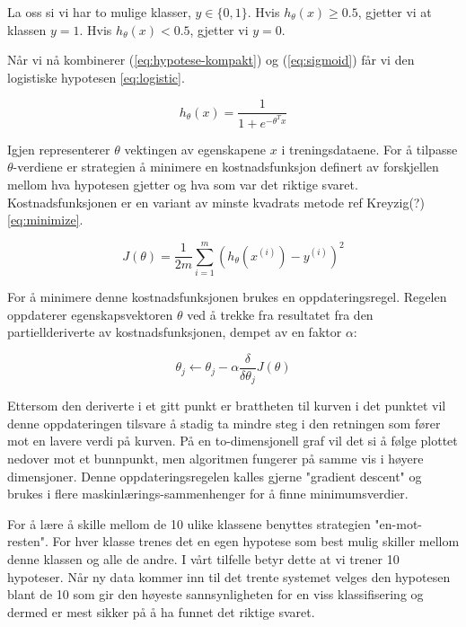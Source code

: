 La oss si vi har to mulige klasser, \(y \in \{0,1\}\). Hvis \( h_\theta(x) \geq  0.5\), gjetter vi at klassen \(y = 1\). Hvis \( h_\theta(x) < 0.5\), gjetter vi \(y = 0\).

Når vi nå kombinerer (\ref{eq:hypotese-kompakt}) og (\ref{eq:sigmoid}) får vi den logistiske hypotesen \ref{eq:logistic}.

\begin{equation}
h_\theta(x) = \frac{1}{1 + e^{-\theta^{T}x}}
\label{eq:logistic}
\end{equation}

Igjen representerer $\theta$ vektingen av egenskapene $x$ i treningsdataene. For å tilpasse $\theta$-verdiene er strategien å minimere en kostnadsfunksjon definert av forskjellen mellom hva hypotesen gjetter og hva som var det riktige svaret. Kostnadsfunksjonen er en variant av minste kvadrats metode {\color{red}ref Kreyzig(?)} \ref{eq:minimize}. 

\begin{equation}
J(\theta) = 
    \frac{1}{2m} \sum_{i=1}^{m} (h_\theta(x^{(i)})-y^{(i)})^2
\label{eq:minimize}
\end{equation}

For å minimere denne kostnadsfunksjonen brukes en oppdateringsregel. Regelen oppdaterer egenskapsvektoren $\theta$ ved å trekke fra resultatet fra den partiellderiverte av kostnadsfunksjonen, dempet av en faktor $\alpha$:

\begin{equation}
\theta_j \leftarrow \theta_j - \alpha \frac{\delta}{\delta\theta_j}J(\theta)
\label{eq:gradient}
\end{equation}

Ettersom den deriverte i et gitt punkt er brattheten til kurven i det punktet vil denne oppdateringen tilsvare å stadig ta mindre steg i den retningen som fører mot en lavere verdi på kurven. På en to-dimensjonell graf vil det si å følge plottet nedover mot et bunnpunkt, men algoritmen fungerer på samme vis i høyere dimensjoner. Denne oppdateringsregelen kalles gjerne "gradient descent" og brukes i flere maskinlærings-sammenhenger for å finne minimumsverdier.

For å lære å skille mellom de 10 ulike klassene benyttes strategien "en-mot-resten". For hver klasse trenes det en egen hypotese som best mulig skiller mellom denne klassen og alle de andre. I vårt tilfelle betyr dette at vi trener 10 hypoteser. Når ny data kommer inn til det trente systemet velges den hypotesen blant de 10 som gir den høyeste sannsynligheten for en viss klassifisering og dermed er mest sikker på å ha funnet det riktige svaret.

